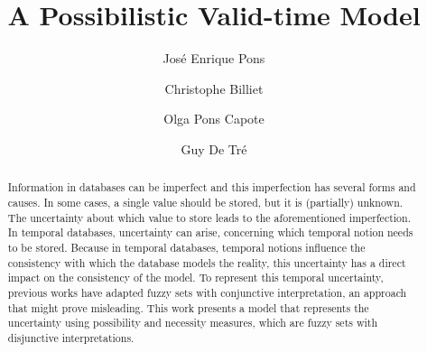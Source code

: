 \documentclass{llncs}
\begin{document}
\mainmatter              %
%
\title{A Possibilistic Valid-time Model}
%
%
\author{Jos\'e Enrique Pons \and Christophe Billiet \and Olga Pons Capote \and Guy De Tr\'e}
%
%
%

\maketitle              %
\def\JPicScale{0.5}
\begin{abstract}
Information in databases can be imperfect and this imperfection has several forms and causes. In some cases, a single value should be stored, but it is (partially) unknown. The uncertainty about which value to store leads to the aforementioned imperfection. In temporal databases, uncertainty can arise, concerning which temporal notion needs to be stored. Because in temporal databases, temporal notions influence the consistency with which the database models the reality, this uncertainty has a direct impact on the consistency of the model. To represent this temporal uncertainty, previous works have adapted fuzzy sets with conjunctive interpretation, an approach that might prove misleading. This work presents a model that represents the uncertainty using possibility and necessity measures, which are fuzzy sets with disjunctive interpretations.
\end{abstract}
\end{document}
